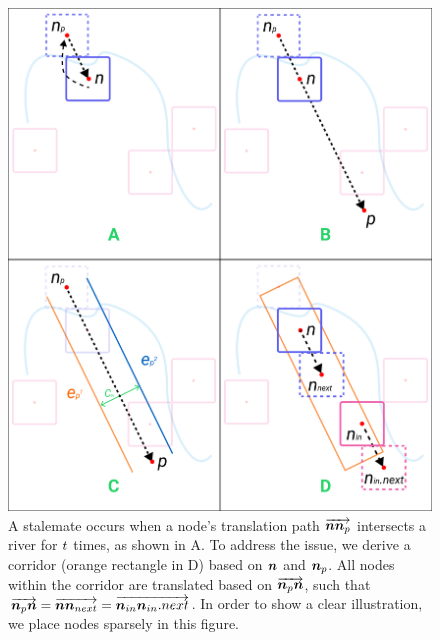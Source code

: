 {
\begin{figure}[tb!]
    \centering
    \includegraphics[width=\columnwidth]{figure/corridor.png}
    \caption{A stalemate occurs when a node's translation path $ \protect\overrightarrow{\bm{n}\bm{n}_{p}} $ intersects a river for $ t $ times, as shown in A. To address the issue, we derive a corridor (orange rectangle in D) based on $ \bm{n} $ and $ \bm{n}_{p} $. All nodes within the corridor are translated based on $ \protect\overrightarrow{\bm{n}_{p}\bm{n}} $, such that $ \protect\overrightarrow{\bm{n}_{p}\bm{n}} = \protect\overrightarrow{\bm{n}\bm{n}_{next}} = \protect\overrightarrow{\bm{n}_{in}\bm{n}_{in}.next} $. In order to show a clear illustration, we place nodes sparsely in this figure.}
    \label{fig:corridor}
\end{figure}
}


